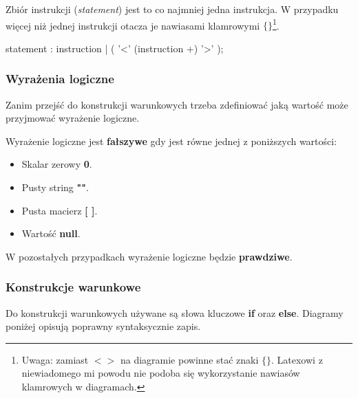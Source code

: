 \documentclass[12pt,a4paper]{article}
\begin{document}
Zbiór instrukcji (\emph{statement}) jest to co najmniej jedna instrukcja. W przypadku więcej niż jednej instrukcji otacza je nawiasami klamrowymi \textbf{$\{\}$}\footnote{Uwaga: zamiast \textbf{$< >$} na diagramie powinne stać znaki \textbf{$\{ \}$}. Latexowi z niewiadomego mi powodu nie podoba się wykorzystanie nawiasów klamrowych w diagramach.}.

\begin{rail}
  statement : instruction | ( '<' (instruction +) '>' );
\end{rail}



\subsubsection{Wyrażenia logiczne}

Zanim przejść do konstrukcji warunkowych trzeba zdefiniować jaką wartość może przyjmować wyrażenie logiczne.

Wyrażenie logiczne jest \textbf{fałszywe} gdy jest równe jednej z poniższych wartości:

\begin{itemize}

  \item Skalar zerowy \textbf{0}.
  \item Pusty string \textbf{""}.
  \item Pusta macierz \textbf{[ ]}.
  \item Wartość \textbf{null}.

\end{itemize}

W pozostałych przypadkach wyrażenie logiczne będzie \textbf{prawdziwe}.

\pagebreak

\subsubsection{Konstrukcje warunkowe}

Do konstrukcji warunkowych używane są słowa kluczowe \textbf{if} oraz \textbf{else}. Diagramy poniżej opisują poprawny syntaksycznie zapis.

\hspace*{-0.8cm}
\end{document}
